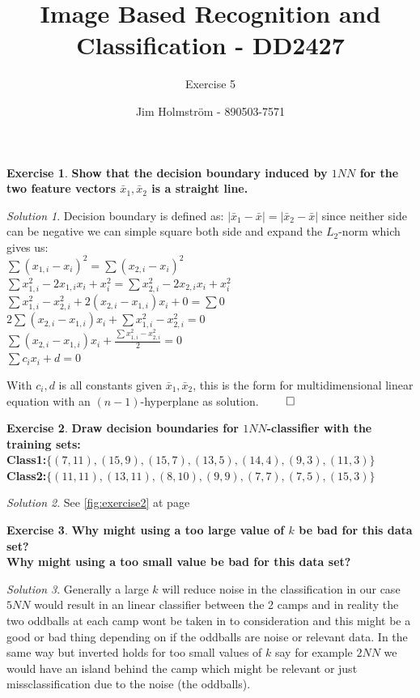 \documentclass[a4paper,twoside=false,abstract=false,numbers=noenddot,
titlepage=false,headings=small,parskip=half,version=last]{scrartcl}
\author{Jim Holmström - 890503-7571}
\title{Image Based Recognition and Classification - DD2427}
\subtitle{Exercise 5}
\theoremstyle{definition}
\newtheorem{exercise}{Exercise}
\theoremstyle{remark}
\newtheorem*{solution}{Solution}
\begin{document}
\maketitle
\thispagestyle{empty}

\begin{exercise}
{\bf
    Show that the decision boundary induced by $1NN$ for the two feature vectors
    $\bar{x}_1,\bar{x}_2$ is a straight line.
}
\end{exercise}
\begin{solution}
    Decision boundary is defined as: $|\bar{x}_1-\bar{x}|=|\bar{x}_2-\bar{x}|$
    since neither side can be negative we can simple square both side and expand
    the $L_2$-norm which gives us:\\

    $\sum{(x_{1,i}-x_i)^2}=\sum{(x_{2,i}-x_i)^2}$\\
    $\sum{x_{1,i}^2-2x_{1,i}x_i+x_i^2}=\sum{x_{2,i}^2-2x_{2,i}x_i+x_i^2}$\\
    $\sum{x_{1,i}^2-x_{2,i}^2+2(x_{2,i}-x_{1,i})x_i+0}=\sum{0}$\\
    $2\sum{(x_{2,i}-x_{1,i})x_i}+\sum{x_{1,i}^2-x_{2,i}^2}=0$\\
    $\sum{(x_{2,i}-x_{1,i})x_i}+\frac{\sum{x_{1,i}^2-x_{2,i}^2}}{2}=0$\\
    $\sum{c_ix_i}+d=0$

    With $c_i,d$ is all constants given $\bar{x}_1,\bar{x}_2$, this is the form
    for multidimensional linear equation with an $(n-1)$-hyperplane as
    solution. $\qed$
\end{solution}
\begin{exercise}
\bf{
    Draw decision boundaries for $1NN$-classifier with the training sets:\\
    Class1:$\{(7, 11), (15, 9), (15, 7), (13, 5), (14, 4), (9, 3), (11, 3)\}$\\
    Class2:$\{(11, 11), (13, 11), (8, 10), (9, 9), (7, 7), (7, 5), (15, 3)\}$\\
}
\end{exercise}
\begin{solution}
    See \eqref{fig:exercise2} at page \pageref{fig:exercise2}
\end{solution}

\begin{exercise}
\bf{
    Why might using a too large value of $k$ be bad for this data set?\\
    Why might using a too small value be bad for this data set?
}
\end{exercise}
\begin{solution}
Generally a large $k$ will reduce noise in the classification in our case $5NN$
would result in an linear classifier between the 2 camps and in reality the two
oddballs at each camp wont be taken in to consideration and this might be a
good or bad thing depending on if the oddballs are noise or relevant data.
In the same way but inverted holds for too small values of $k$ say for example
$2NN$ we would have an island behind the camp which might be relevant or just
missclassification due to the noise (the oddballs).
\end{solution}
\end{document}
